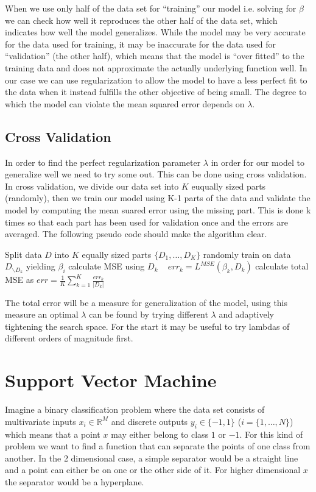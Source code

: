 \documentclass[12pt]{article}
\newcommand{\dom}[1]{\mathbb{#1}}
\begin{document}
When we use only half of the data set for \enquote{training} our model i.e. solving for $\beta$ we can check how well it reproduces the other half of the data set, which indicates how well the model generalizes.
While the model may be very accurate for the data used for training, it may be inaccurate for the data used for \enquote{validation} (the other half), which means that the model is \enquote{over fitted} to the training data and does not approximate the actually underlying function well.
In our case we can use regularization to allow the model to have a less perfect fit to the data when it instead fulfills the other objective of being small.
The degree to which the model can violate the mean squared error depends on $\lambda$.

\subsection{Cross Validation}
In order to find the perfect regularization parameter $\lambda$ in order for our model to generalize well we need to try some out.
This can be done using cross validation.
In cross validation, we divide our data set into $K$ euqually sized parts (randomly), then we train our model using K-1 parts of the data and validate the model by computing the mean suared error using the missing part.
This is done k times so that each part has been used for validation once and the errors are averaged.
The following pseudo code should make the algorithm clear.
\begin{algorithmic}[1]
\State Split data $D$ into $K$ equally sized parts $\{D_1,\dots,D_K\}$ randomly
\State train on data $D_{\backslash D_k}$ yielding $\beta_i$
\State calculate MSE using $D_k$ ~ $err_k = L^{MSE}(\beta_k,D_k)$
\EndFor
\State calculate total MSE as $err=\frac{1}{K}\sum_{k=1}^K \frac{err_k}{|D_k|}$ 
\end{algorithmic}
The total error will be a measure for generalization of the model, using this measure an optimal $\lambda$ can be found by trying different $\lambda$ and adaptively tightening the search space.
For the start it may be useful to try lambdas of different orders of magnitude first.


\section{Support Vector Machine}
Imagine a binary classification problem where the data set consists of multivariate inputs $x_i \in \dom{R}^M$ and discrete outputs $y_i \in \{-1,1\}$ ($i = \{1,\dots,N\}$) which means that a point $x$ may either belong to class $1$ or $-1$.
For this kind of problem we want to find a function that can separate the points of one class from another.
In the 2 dimensional case, a simple separator would be a straight line and a point can either be on one or the other side of it.
For higher dimensional $x$ the separator would be a hyperplane.
\end{document}
